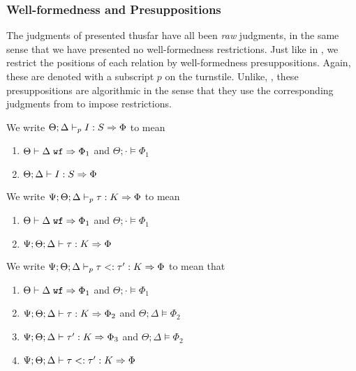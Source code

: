 \subsubsection{Well-formedness and Presuppositions}
The judgments of \bilambdaamor presented thusfar have all been \textit{raw} judgments, in the same sense that we have presented no well-formedness restrictions. Just like in \dlambdaamor, we restrict the positions of each relation by well-formedness presuppositions. Again, these are denoted with a subscript $p$ on the turnstile.
Unlike, \dlambdaamor, these presuppositions are algorithmic in the sense that they use the corresponding judgments from \bilambdaamor to impose restrictions. 

\begin{definition}
We write $\Theta ; \Delta \vdash_p I : S \Rightarrow \Phi$ to mean
\begin{enumerate}
  \item $\Theta \vdash \Delta \; \texttt{wf} \Rightarrow \Phi_1$ and $\Theta ; \cdot \vDash \Phi_1$
  \item $\Theta ; \Delta \vdash I : S \Rightarrow \Phi$
\end{enumerate}
\end{definition}

\begin{definition}
We write $\Psi ; \Theta ; \Delta \vdash_p \tau : K \Rightarrow \Phi$ to mean
\begin{enumerate}
  \item $\Theta \vdash \Delta \; \texttt{wf} \Rightarrow \Phi_1$ and $\Theta ; \cdot \vDash \Phi_1$
  \item $\Psi ; \Theta ; \Delta \vdash \tau : K \Rightarrow \Phi$
\end{enumerate}
\end{definition}

\begin{definition}
We write $\Psi ; \Theta ; \Delta \vdash_p \tau <: \tau' : K \Rightarrow \Phi$ to mean that
\begin{enumerate}
  \item $\Theta \vdash \Delta \; \texttt{wf} \Rightarrow \Phi_1$ and $\Theta ; \cdot \vDash \Phi_1$
  \item $\Psi ; \Theta ; \Delta \vdash \tau : K \Rightarrow \Phi_2$ and $\Theta ; \Delta \vDash \Phi_2$
  \item $\Psi ; \Theta ; \Delta \vdash \tau' : K \Rightarrow \Phi_3$ and $\Theta ; \Delta \vDash \Phi_2$
  \item $\Psi ; \Theta ; \Delta \vdash \tau <: \tau' : K \Rightarrow \Phi$
\end{enumerate}
\end{definition}

